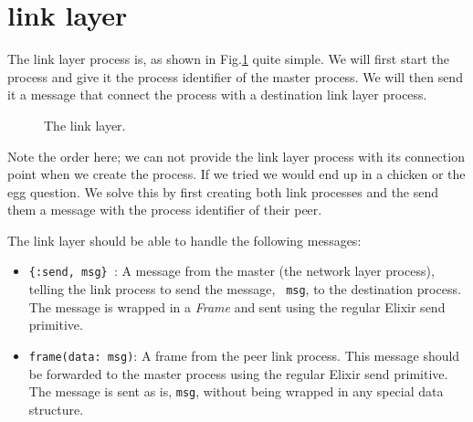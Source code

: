 \documentclass[a4paper,11pt]{article}
\begin{document}
\section{link layer}

The link layer process is, as shown in Fig.\ref{fig:link} quite
simple. We will first start the process and give it the process
identifier of the master process. We will then send it a message that
connect the process with a destination link layer process. 

\begin{figure}
\centering  
{}

\caption{The link layer.}
\label{fig:link}

\end{figure}

Note the order here; we can not provide the link layer process with
its connection point when we create the process. If we tried we would
end up in a chicken or the egg question. We solve this by first
creating both link processes and the send them a message with the process
identifier of their peer.

The link layer should be able to handle the following messages:

\begin{itemize}

\item {\tt \{:send, msg\} }: A message from the master (the network
  layer process), telling the link process to send the message, {\tt
    msg}, to the destination process. The message is wrapped in a {\em
    Frame} and sent using the regular Elixir send primitive.

  \item {\tt frame(data: msg)}: A frame from the peer  link
    process. This message should be forwarded to the master process
    using the regular Elixir send primitive. The message is sent as
    is, {\tt msg}, without being wrapped in any special data structure.
\end{itemize}
\end{document}
